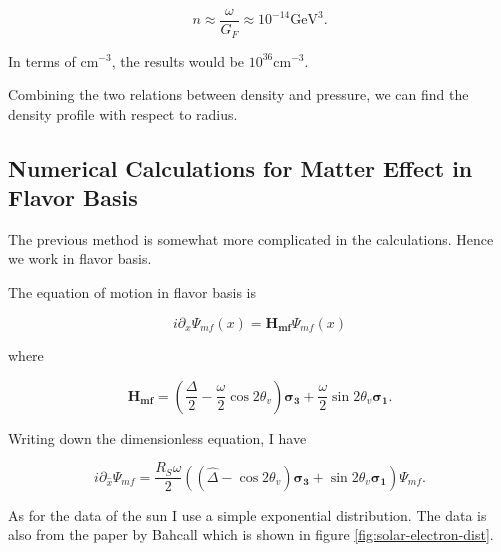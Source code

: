 \documentclass{tufte-handout}
\begin{document}
\begin{equation*}
n \approx \frac{\omega}{G_F} \approx 10^{-14} \mathrm{GeV^3} .
\end{equation*}





In terms of $\mathrm{cm^{-3}}$, the results would be $ 10^{36} \mathrm{cm^{-3}}$.

Combining the two relations between density and pressure, we can find the density profile with respect to radius.





\subsection{Numerical Calculations for Matter Effect in Flavor Basis}


The previous method is somewhat more complicated in the calculations. Hence we work in flavor basis.


The equation of motion in flavor basis is

\begin{equation*}
i\partial_x \Psi_{mf}(x) = \mathbf{H_{mf}} \Psi_{mf}(x)
\end{equation*}

where 

\begin{equation*}
\mathbf{H_{mf}} =  \left(  \frac{\Delta}{2} -  \frac{\omega}{2} \cos 2\theta_v  \right) \boldsymbol{\sigma_3} + \frac{\omega}{2} \sin 2\theta_v \boldsymbol{\sigma_1}.
\end{equation*}

Writing down the dimensionless equation, I have 

\begin{equation*}
i \partial_{\hat x} \Psi_{mf} = \frac{R_S \omega}{2} ( (\hat\Delta - \cos 2\theta_v ) \boldsymbol{\sigma_3} + \sin 2\theta_v \boldsymbol{\sigma_1} )  \Psi_{mf} .
\end{equation*}


As for the data of the sun I use a simple exponential distribution. The data is also from the paper by Bahcall which is shown in figure \ref{fig:solar-electron-dist}.
\end{document}
